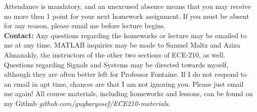 \documentclass[12pt]{article}
\begin{document}
Attendance is mandatory, and an unexcused absence means that you may
receive no more then 1 point for your next homework assignment. 
If you must be absent for any reason, please email me before lecture begins. \\

\textbf{Contact:}
Any questions regarding the homeworks or lecture may be emailed 
to me at any time.
MATLAB inquiries may be made to Samuel Maltz and Aziza Almanakly, 
the instructors of the other two sections of ECE-210, as well. 
Questions regarding Signals and Systems may be directed towards myself, 
although they are often better left for Professor Fontaine. 
If I do not respond to an email in apt time, 
chances are that I am not ignoring you. 
Please just email me again!
All course materials, including homeworks and lessons,
can be found on my Github \textit{github.com/guybaryosef/ECE210-materials}.
\end{document}
